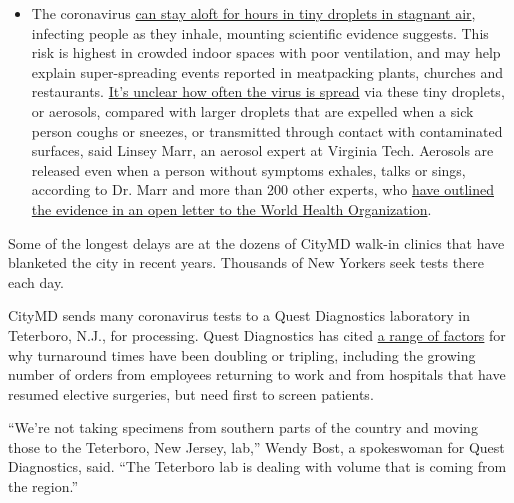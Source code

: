 \begin{itemize}
  \begin{itemize}
  \tightlist
  \item
    The coronavirus
    \href{https://www.nytimes.com/2020/07/04/health/239-experts-with-one-big-claim-the-coronavirus-is-airborne.html?action=click\&pgtype=Article\&state=default\&region=MAIN_CONTENT_3\&context=storylines_faq}{can
    stay aloft for hours in tiny droplets in stagnant air}, infecting
    people as they inhale, mounting scientific evidence suggests. This
    risk is highest in crowded indoor spaces with poor ventilation, and
    may help explain super-spreading events reported in meatpacking
    plants, churches and restaurants.
    \href{https://www.nytimes.com/2020/07/06/health/coronavirus-airborne-aerosols.html?action=click\&pgtype=Article\&state=default\&region=MAIN_CONTENT_3\&context=storylines_faq}{It's
    unclear how often the virus is spread} via these tiny droplets, or
    aerosols, compared with larger droplets that are expelled when a
    sick person coughs or sneezes, or transmitted through contact with
    contaminated surfaces, said Linsey Marr, an aerosol expert at
    Virginia Tech. Aerosols are released even when a person without
    symptoms exhales, talks or sings, according to Dr. Marr and more
    than 200 other experts, who
    \href{https://academic.oup.com/cid/article/doi/10.1093/cid/ciaa939/5867798}{have
    outlined the evidence in an open letter to the World Health
    Organization}.
  \end{itemize}
\end{itemize}

Some of the longest delays are at the dozens of CityMD walk-in clinics
that have blanketed the city in recent years. Thousands of New Yorkers
seek tests there each day.

CityMD sends many coronavirus tests to a Quest Diagnostics laboratory in
Teterboro, N.J., for processing. Quest Diagnostics has cited
\href{https://newsroom.questdiagnostics.com/COVIDTestingUpdates}{a range
of factors} for why turnaround times have been doubling or tripling,
including the growing number of orders from employees returning to work
and from hospitals that have resumed elective surgeries, but need first
to screen patients.

``We're not taking specimens from southern parts of the country and
moving those to the Teterboro, New Jersey, lab,'' Wendy Bost, a
spokeswoman for Quest Diagnostics, said. ``The Teterboro lab is dealing
with volume that is coming from the region.''

